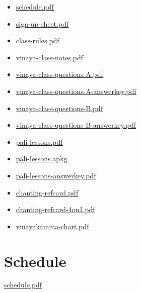 \begin{itemize}
\tightlist
\item
  \href{./includes/docs/schedule.pdf}{schedule.pdf}
\item
  \href{./includes/docs/sign-up-sheet.pdf}{sign-up-sheet.pdf}
\item
  \href{./includes/docs/class-rules.pdf}{class-rules.pdf}
\item
  \href{./includes/docs/vinaya-class-notes.pdf}{vinaya-class-notes.pdf}
\item
  \href{./includes/docs/vinaya-class-questions-A.pdf}{vinaya-class-questions-A.pdf}
\item
  \href{./includes/docs/vinaya-class-questions-A-answerkey.pdf}{vinaya-class-questions-A-answerkey.pdf}
\item
  \href{./includes/docs/vinaya-class-questions-B.pdf}{vinaya-class-questions-B.pdf}
\item
  \href{./includes/docs/vinaya-class-questions-B-answerkey.pdf}{vinaya-class-questions-B-answerkey.pdf}
\item
  \href{./includes/docs/pali-lessons.pdf}{pali-lessons.pdf}
\item
  \href{./includes/docs/pali-lessons.apkg}{pali-lessons.apkg}
\item
  \href{./includes/docs/pali-lessons-answerkey.pdf}{pali-lessons-answerkey.pdf}
\item
  \href{./includes/docs/chanting-refcard.pdf}{chanting-refcard.pdf}
\item
  \href{./includes/docs/chanting-refcard-4on1.pdf}{chanting-refcard-4on1.pdf}
\item
  \href{./includes/docs/vinayakamma-chart.pdf}{vinayakamma-chart.pdf}
\end{itemize}

\section{Schedule}

\href{./includes/docs/schedule.pdf}{schedule.pdf}

